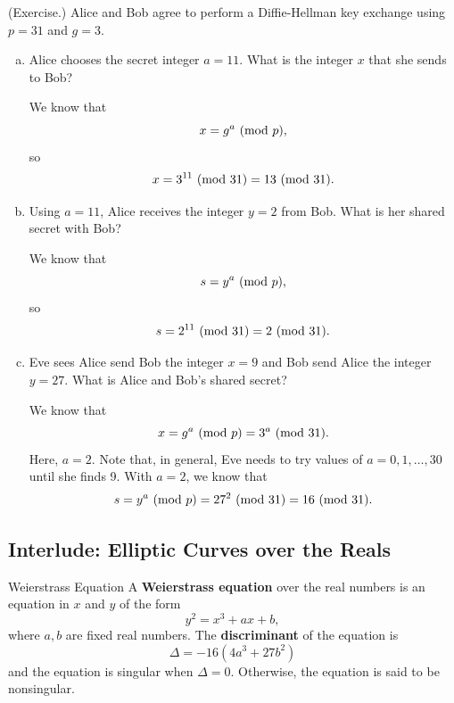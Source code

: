 \documentclass[letterpaper]{article}
\begin{document}
\begin{mdframed}
    (Exercise.) Alice and Bob agree to perform a Diffie-Hellman key exchange using $p = 31$ and $g = 3$. 
    
    \begin{enumerate}[(a)]
        \item Alice chooses the secret integer $a = 11$. What is the integer $x$ that she sends to Bob?
        \begin{mdframed}
            We know that 
            \[x = g^a \ (\mathrm{mod}\ p),\]
            so 
            \[x = 3^{11} \ (\mathrm{mod}\ 31) = 13 \ (\mathrm{mod}\ 31).\] 
        \end{mdframed}

        \item Using $a = 11$, Alice receives the integer $y = 2$ from Bob. What is her shared secret with Bob? 
        \begin{mdframed}
            We know that 
            \[s = y^a \ (\mathrm{mod}\ p),\]
            so 
            \[s = 2^{11} \ (\mathrm{mod}\ 31) = 2 \ (\mathrm{mod}\ 31).\]
        \end{mdframed}

        \item Eve sees Alice send Bob the integer $x = 9$ and Bob send Alice the integer $y = 27$. What is Alice and Bob's shared secret? 
        \begin{mdframed}
            We know that 
            \[x = g^a \ (\mathrm{mod}\ p) = 3^a \ (\mathrm{mod}\ 31).\]
            Here, $a = 2$. Note that, in general, Eve needs to try values of $a = 0, 1, \hdots, 30$ until she finds 9. With $a = 2$, we know that 
            \[s = y^a \ (\mathrm{mod}\ p) = 27^{2} \ (\mathrm{mod}\ 31) = 16 \ (\mathrm{mod}\ 31).\]
        \end{mdframed}
    \end{enumerate}
\end{mdframed}


\subsection{Interlude: Elliptic Curves over the Reals}
\begin{definition}{Weierstrass Equation}{}
    A \textbf{Weierstrass equation} over the real numbers is an equation in $x$ and $y$ of the form 
    \[y^2 = x^3 + ax + b,\]
    where $a, b$ are fixed real numbers. The \textbf{discriminant} of the equation is 
    \[\Delta = -16(4a^3 + 27b^2)\]
    and the equation is singular when $\Delta = 0$. Otherwise, the equation is said to be nonsingular. 
\end{definition}
\end{document}
